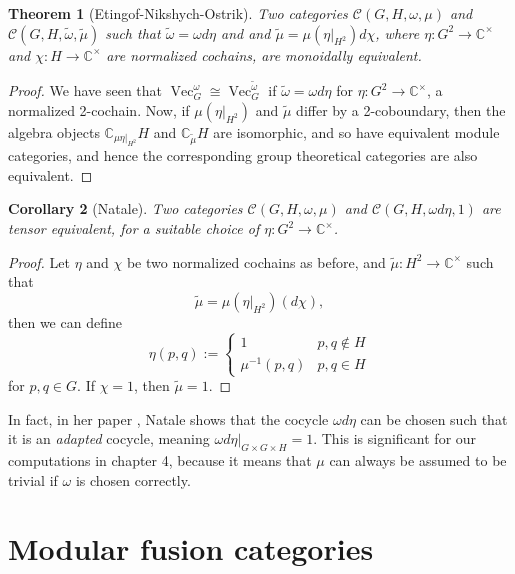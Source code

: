 \documentclass[11pt]{book}
\newtheorem{theorem}{Theorem}[section]
\newtheorem{Cor}[theorem]{Corollary}
\theoremstyle{Rem}
\theoremstyle{definition}
\numberwithin{equation}{section}
\newcommand\inv{^{-1}}
\newcommand\Vect{\operatorname{Vec}}
\newcommand\CC{\mathbb C}
\newcommand\C{\mathcal C}
\begin{document}
\begin{theorem}[Etingof-Nikshych-Ostrik]\label{adapted}
Two categories $\C(G, H, \omega, \mu)$ and  $\C(G, H, \tilde{\omega}, \tilde{\mu})$  such that $\tilde{\omega} = \omega d\eta$ and and $\tilde{\mu} =\mu (\eta|_{H^2}) d\chi$, where $\eta:G^2\rightarrow \CC^\times$ and $\chi:H\rightarrow \CC^\times$ are normalized cochains, are monoidally equivalent.\end{theorem}
\begin{proof}
We have seen that $\Vect^\omega_G\cong \Vect^{\tilde{\omega}}_G$ if $\tilde{\omega} = \omega d\eta$ for $\eta: G^2\rightarrow \CC^\times$, a normalized 2-cochain. Now, if $\mu(\eta|_{H^2})$ and $\tilde{\mu}$ differ by a 2-coboundary, then the algebra objects $\CC_{\mu\eta|_{H^2}}H$ and $\CC_{\tilde{\mu}}H$ are isomorphic, and so have equivalent module categories, and hence the corresponding group theoretical categories are also equivalent.
\end{proof}
\begin{Cor}[Natale]\label{natale}
Two categories $\C(G, H, \omega, \mu)$ and $\C(G, H, \omega d\eta, 1)$ are tensor equivalent, for a suitable choice of $\eta:G^2\rightarrow \CC^\times$.\end{Cor}
\begin{proof}

Let $\eta$ and $\chi$ be two normalized cochains as before, and  $\tilde{\mu}:H^2\rightarrow \CC^\times$ such that \begin{equation} 
	 \tilde{\mu} = \mu(\eta|_{H^2})(d\chi),
\end{equation} then we can define \begin{equation}
	\eta(p,q) := \begin{cases} 1 & p,q \not\in H \\ \mu\inv(p,q) & p,q\in H \end{cases}
\end{equation} for $p,q \in G$. If $\chi=1$, then $\tilde{\mu} = 1$.
\end{proof}
In fact, in her paper \cite{Nat:FSICFC}, Natale shows that the cocycle $\omega d\eta$ can be chosen such that it is an \textit{adapted} cocycle, meaning $\omega d\eta|_{G\times G\times H} =1$.  This is significant for our computations in chapter 4, because it means that $\mu$ can always be assumed to be trivial if $\omega$ is chosen correctly.


\section{Modular fusion categories}
\end{document}
